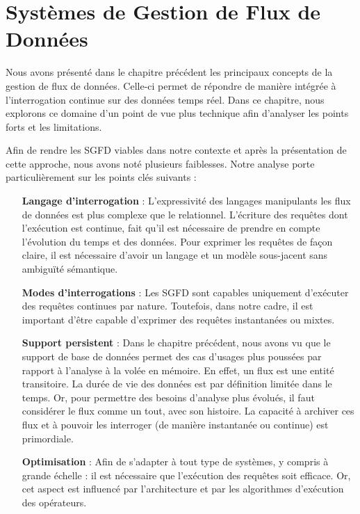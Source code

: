 
\chapter{Systèmes de Gestion de Flux de Données}\label{chap:rw:sgfd}
\chaptertoc
Nous avons présenté dans le chapitre précédent les principaux concepts de la gestion de flux de données. Celle-ci permet de répondre de manière intégrée à l'interrogation continue sur des données temps réel. Dans ce chapitre, nous explorons ce domaine d'un point de vue plus technique afin d'analyser les points forts et les limitations.

Afin de rendre les SGFD viables dans notre contexte et après la présentation de cette approche, nous avons noté plusieurs faiblesses. Notre analyse porte particulièrement sur les points clés suivants : 
\begin{itemize}
	\item[\textbf{Langage d'interrogation}] : L'expressivité des langages manipulants les flux de données est plus complexe que le relationnel. L'écriture des requêtes dont l'exécution est continue, fait qu'il est nécessaire de prendre en compte l'évolution du temps et des données. Pour exprimer les requêtes de façon claire, il est nécessaire d'avoir un langage et un modèle sous-jacent sans ambiguïté sémantique.
	\item[\textbf{Modes d'interrogations}] : Les SGFD sont capables uniquement d'exécuter des requêtes continues par nature. Toutefois, dans notre cadre, il est important d'être capable d'exprimer des requêtes instantanées ou mixtes. 
	\item[\textbf{Support persistent}] : Dans le chapitre précédent, nous avons vu que le support de base de données permet des cas d'usages plus poussées par rapport à l'analyse à la volée en mémoire. En effet, un flux est une entité transitoire. La durée de vie des données est par définition limitée dans le temps. Or, pour permettre des besoins d'analyse plus évolués, il faut considérer le flux comme un tout, avec son histoire. La capacité à archiver ces flux et à pouvoir les interroger (de manière instantanée ou continue) est primordiale.
	\item[\textbf{Optimisation}] : Afin de s'adapter à tout type de systèmes, y compris à grande échelle : il est nécessaire que l'exécution des requêtes soit efficace. Or, cet aspect est influencé par l'architecture et par les algorithmes d'exécution des opérateurs.
\end{itemize}

